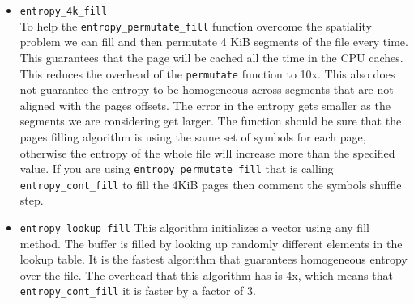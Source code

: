 \begin{itemize}
\item \verb+entropy_4k_fill+ \\
    To help the \verb+entropy_permutate_fill+ function overcome the spatiality problem we can fill and then permutate
    4 KiB segments of the file every time. This guarantees that the page will be cached all the time
    in the CPU caches. This reduces the overhead of the \verb+permutate+ function to 10x. This also does not guarantee
    the entropy to be homogeneous across segments that are not aligned with the pages offsets. The error in the entropy
    gets smaller as the segments we are considering get larger. The function should be sure that the pages filling
    algorithm is using the same set of symbols for each page, otherwise the entropy of the whole file will increase more than the specified value. If
    you are using \verb+entropy_permutate_fill+ that is calling \verb+entropy_cont_fill+  to fill the 4KiB pages then comment the 
    symbols shuffle step.

\item \verb+entropy_lookup_fill+
    This algorithm initializes a vector using any fill method.
    The buffer is filled by looking up randomly different elements
    in the lookup table. It is the fastest algorithm that guarantees
    homogeneous entropy over the file. The overhead that this algorithm has is 4x, which means
    that \verb+entropy_cont_fill+ it is faster by a factor of 3.
\end{itemize}
